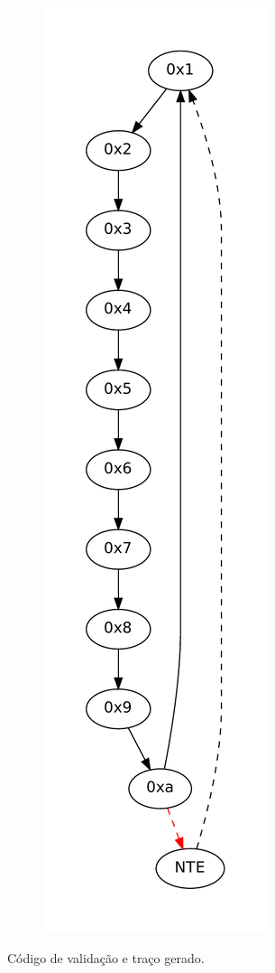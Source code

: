 \documentclass[12pt,twoside]{article}
\begin{document}
\begin{figure}[!ht]
\begin{subfigure}[b]{0.3\textwidth}
	\includegraphics[scale=0.5]{./figs/validacao}
	\caption{}
	\label{fig-validacao}
\end{subfigure}

\caption{Código de validação e traço gerado.}
\label{valida_set}
\end{figure}
\end{document}
